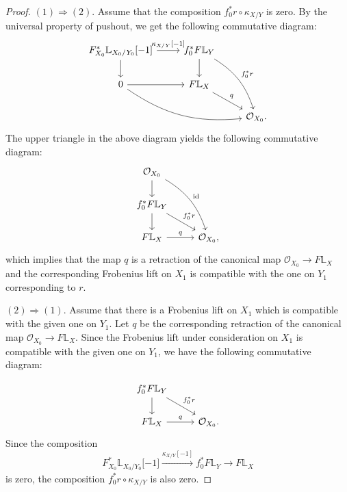 \documentclass[10pt,a4paper]{amsart}
\begin{document}
\begin{proof}
$(1)\Rightarrow (2)$. Assume that the composition $f_0^*r\circ \kappa_{X/Y}$ is zero. By the universal property of pushout, we get the following commutative diagram:
\[
\begin{tikzcd}
  F^*_{X_0}\mathbb L_{X_0/Y_0} \lbrack -1 \rbrack \arrow[r, "\kappa_{X/Y}\lbrack -1\rbrack "] \arrow[d,] 
    & f^*_0F\mathbb L_{Y} \arrow[d, ] \arrow[ddr, "f^*_0r", bend left=20] \\
  0 \arrow[r, ] \arrow[drr, bend right=20] 
    & F\mathbb L_X \arrow[dr, "q"] \\
  & & \mathcal O_{X_0}.
\end{tikzcd}
\]
The upper triangle in the above diagram yields the following commutative diagram:
\[
\begin{tikzcd}
  \mathcal O_{X_0} \arrow[d] \arrow[ddr, "\mathrm{id}", bend left=20] & \\
  f^*_0F\mathbb L_{Y} \arrow[d] \arrow[dr, "f^*_0r"] & \\
  F\mathbb L_X \arrow[r, "q"] & \mathcal O_{X_0},
\end{tikzcd}
\]
which implies that the map $q$ is a retraction of the canonical map $\mathcal O_{X_0}\to F\mathbb L_X$ and the corresponding Frobenius lift on $X_1$ is compatible with the one on $Y_1$ corresponding to $r$.

$(2)\Rightarrow (1)$. Assume that there is a Frobenius lift on $X_1$ which is compatible with the given one on $Y_1$. Let $q$ be the corresponding retraction of the canonical map $ \mathcal O_{X_0}\to F\mathbb L_X$. Since the Frobenius lift under consideration on $X_1$ is compatible with the given one on $Y_1$, we have the following commutative diagram:

\[\begin{tikzcd}
    f_0^*F\mathbb L_Y \arrow[d] \arrow[dr, "f_0^*r"] &\\
    F\mathbb L_X \arrow[r, "q"] & \mathcal O_{X_0}.
\end{tikzcd}\]
Since the composition
\[ F^*_{X_0}\mathbb L_{X_0/Y_0} \lbrack -1 \rbrack \xrightarrow[]{\kappa_{X/Y}[-1]}f_0^*F\mathbb L_Y\to F\mathbb L_X\]
 is zero, the composition $f^*_0r\circ \kappa_{X/Y}$ is also zero.

\end{proof}
\end{document}
